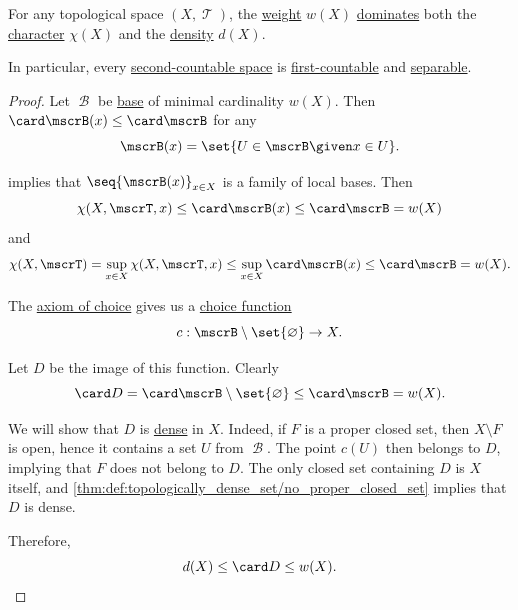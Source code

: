 \begin{proposition}\label{thm:topological_space_countability}
  For any topological space \( (X, \mscrT) \), the \hyperref[def:topological_space_weight]{weight} \( w(X) \) \hyperref[def:set_domination]{dominates} both the \hyperref[def:topological_space_character]{character} \( \chi(X) \) and the \hyperref[def:topological_space_density]{density} \( d(X) \).
\end{proposition}
\begin{comments}
  \item In particular, every \hyperref[def:topological_space_weight]{second-countable space} is \hyperref[def:topological_space_character]{first-countable} and \hyperref[def:topological_space_density]{separable}.
\end{comments}
\begin{proof}
   Let \( \mscrB \) be \hyperref[def:topological_base]{base} of minimal cardinality \( w(X) \). Then \( \card \mscrB(x) \leq \card \mscrB \) for any
  \begin{equation*}
    \mscrB(x) = \set{ U \in \mscrB \given x \in U }.
  \end{equation*}

   implies that \( \seq{ \mscrB(x) }_{x \in X} \) is a family of local bases. Then
  \begin{equation*}
    \chi(X, \mscrT, x) \leq \card \mscrB(x) \leq \card \mscrB = w(X)
  \end{equation*}
  and
  \begin{equation*}
    \chi(X, \mscrT) = \sup_{x \in X} \chi(X, \mscrT, x) \leq \sup_{x \in X} \card \mscrB(x) \leq \card \mscrB = w(X).
  \end{equation*}

   The \hyperref[def:zfc/choice]{axiom of choice} gives us a \hyperref[def:choice_function]{choice function}
  \begin{equation*}
    c: \mscrB \setminus \set{ \varnothing } \to X.
  \end{equation*}

  Let \( D \) be the image of this function. Clearly
  \begin{equation*}
    \card D = \card \mscrB \setminus \set{ \varnothing } \leq \card \mscrB = w(X).
  \end{equation*}

  We will show that \( D \) is \hyperref[def:topologically_dense_set]{dense} in \( X \). Indeed, if \( F \) is a proper closed set, then \( X \setminus F \) is open, hence it contains a set \( U \) from \( \mscrB \). The point \( c(U) \) then belongs to \( D \), implying that \( F \) does not belong to \( D \). The only closed set containing \( D \) is \( X \) itself, and \cref{thm:def:topologically_dense_set/no_proper_closed_set} implies that \( D \) is dense.

  Therefore,
  \begin{equation*}
    d(X) \leq \card D \leq w(X).
  \end{equation*}
\end{proof}

